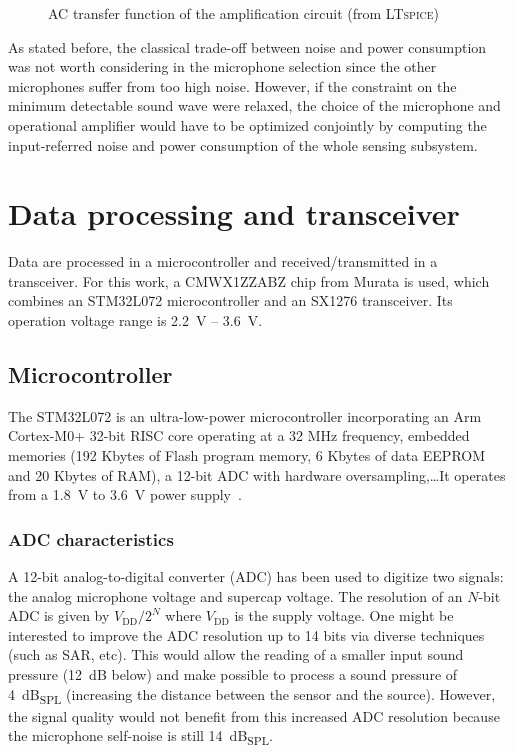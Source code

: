 \documentclass{EPL-master-thesis-covers-EN}
\newcommand{\te}[1]{\textrm{#1}}
\begin{document}
\begin{figure}[H]
    \centering
    
    \caption{AC transfer function of the amplification circuit (from \textsc{LTspice})}
    \label{fig:microphone_AC}
\end{figure}

As stated before, the classical trade-off between noise and power consumption was not worth considering in the microphone selection since the other microphones suffer from too high noise. However, if the constraint on the minimum detectable sound wave were relaxed, the choice of the microphone and operational amplifier would have to be optimized conjointly by computing the input-referred noise and power consumption of the whole sensing subsystem.


\chapter{Data processing and transceiver}

Data are processed in a microcontroller and received/transmitted in a transceiver. For this work, a CMWX1ZZABZ chip from Murata is used, which combines an STM32L072 microcontroller and an SX1276 transceiver. Its operation voltage range is \SI{2.2}{V} -- \SI{3.6}{V}.

\section{Microcontroller}

The STM32L072 is an ultra-low-power microcontroller incorporating an Arm Cortex-M0+ 32-bit RISC core operating at a 32 MHz frequency, embedded memories (192 Kbytes of Flash program memory, 6 Kbytes of data EEPROM and 20 Kbytes of RAM), a 12-bit ADC with hardware oversampling,\dots It operates from a \SI{1.8}{V} to \SI{3.6}{V} power supply~\cite{STM32L072xx}.

\subsection*{ADC characteristics}

A 12-bit analog-to-digital converter (ADC) has been used to digitize two signals: the analog microphone voltage and supercap voltage. The resolution of an $N$-bit ADC is given by $V_\te{DD}/2^N$ where $V_\te{DD}$ is the supply voltage. One might be interested to improve the ADC resolution up to 14 bits via diverse techniques (such as SAR, etc). This would allow the reading of a smaller input sound pressure (\SI{12}{dB} below) and make possible to process a sound pressure of \SI{4}{dB_{SPL}} (increasing the distance between the sensor and the source). However, the signal quality would not benefit from this increased ADC resolution because the microphone self-noise is still \SI{14}{dB_{SPL}}.
\end{document}
